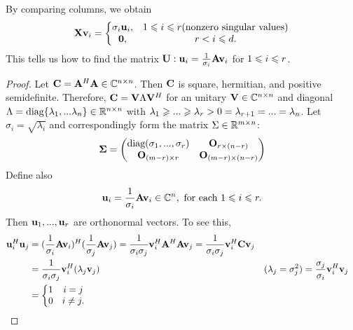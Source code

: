 By comparing columns, we obtain
\begin{align*}
    \bold{X}\bold{v}_i=\left\{\begin{matrix}
        \sigma_i\bold{u}_i,&  1\leqslant i\leqslant r (\text{nonzero singular values})\\
        \bold{0},&  r<i\leqslant d.
       \end{matrix}\right.
\end{align*}
This tells us how to find the matrix $\bold{U}: \bold{u}_i =\frac{1}{\sigma_i}\bold{A}\bold{v}_i$ for $1\leqslant i\leqslant r$.


\begin{proof}
    Let $\bold{C}=\bold{A}^H\bold{A}\in \mathbb{C}^{n\times n}$. Then $\bold{C}$ is square, hermitian, and positive semidefinite.
    Therefore, $\bold{C}=\bold{V}\Lambda\bold{V}^H$ for an unitary $\bold{V}\in \mathbb{C}^{n\times n}$
    and diagonal $\Lambda=\text{diag} \{\lambda_1,...\lambda_n\}\in \mathbb{R}^{n\times n}$ with $\lambda_1\geqslant ...\geqslant \lambda_r>0=\lambda_{r+1}=...=\lambda_n$.
    Let $\sigma_i=\sqrt{\lambda_i}$ and correspondingly form the matrix $\Sigma\in\mathbb{R}^{m\times n}$:
    \begin{align*}
        \bold{\Sigma} = \begin{pmatrix}
            \text{diag}(\sigma_1,...,\sigma_r) &\bold{O}_{r\times (n-r)}\\
            \bold{O}_{(m-r)\times r} &\bold{O}_{(m-r)\times (n-r)}
        \end{pmatrix}
    \end{align*}
    Define also
    \begin{align*}
        \bold{u}_i=\frac{1}{\sigma_i}\bold{A}\bold{v}_i\in\mathbb{C}^n, \text{ for each } 1\leqslant i\leqslant r.
    \end{align*}
    Then $\bold{u}_1,...,\bold{u}_r$ are orthonormal vectors. To see this,
    \begin{align*}
        \bold{u}_i^H\bold{u}_j &= (\frac{1}{\sigma_i} \bold{A}\bold{v}_i)^H (\frac{1}{\sigma_j}\bold{A}\bold{v}_j) = \frac{1}{\sigma_i\sigma_j} \bold{v}_i^H\bold{A}^H\bold{A}\bold{v}_j
        = \frac{1}{\sigma_i\sigma_j} \bold{v}_i^H\bold{C}\bold{v}_j\\
        &= \frac{1}{\sigma_i\sigma_j} \bold{v}_i^H(\lambda_j\bold{v}_j) & (\lambda_j=\sigma_j^2)
        &= \frac{\sigma_j}{\sigma_i} \bold{v}_i^H\bold{v}_j\\
        &= \left\{\begin{matrix}
            1 &  i=j\\
            0 &  i\neq j.
           \end{matrix}\right.

\end{align*}
\end{proof}
